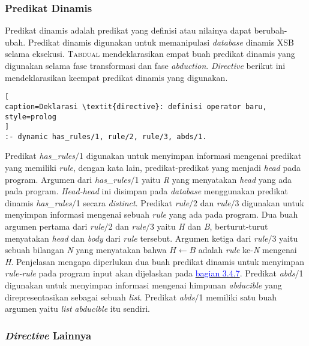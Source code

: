 \subsubsection{Predikat Dinamis}

Predikat dinamis adalah predikat yang definisi atau nilainya dapat berubah-ubah. Predikat dinamis digunakan untuk memanipulasi \textit{database} dinamis XSB selama eksekusi. \textsc{Tabdual} mendeklarasikan empat buah predikat dinamis yang digunakan selama fase transformasi dan fase \textit{abduction}. \textit{Directive} berikut ini mendeklarasikan keempat predikat dinamis yang digunakan. 
\\

\begin{lstlisting}[
caption=Deklarasi \textit{directive}: definisi operator baru,
style=prolog
]
:- dynamic has_rules/1, rule/2, rule/3, abds/1.
\end{lstlisting}

Predikat \textit{has\_rules$/$}1 digunakan untuk menyimpan informasi mengenai predikat yang memiliki \textit{rule}, dengan kata lain, predikat-predikat yang menjadi \textit{head} pada program. Argumen dari \textit{has\_rules$/$}1 yaitu \textit{R} yang menyatakan \textit{head} yang ada pada program. \textit{Head-head} ini disimpan pada \textit{database} menggunakan predikat dinamis \textit{has\_rules$/$}1 secara \textit{distinct}. Predikat \textit{rule$/$}2 dan \textit{rule$/$}3 digunakan untuk menyimpan informasi mengenai sebuah \textit{rule} yang ada pada program. Dua buah argumen pertama dari \textit{rule$/$}2 dan \textit{rule$/$}3 yaitu \textit{H} dan \textit{B}, berturut-turut menyatakan \textit{head} dan \textit{body} dari \textit{rule} tersebut. Argumen ketiga dari \textit{rule$/$}3 yaitu sebuah bilangan \textit{N} yang menyatakan bahwa \textit{$H \leftarrow B$} adalah \textit{rule} ke-\textit{N} mengenai \textit{H}.\label{rule2to3} Penjelasan mengapa diperlukan dua buah predikat dinamis untuk menyimpan \textit{rule-rule} pada program input akan dijelaskan pada \hyperref[subsec:add_indices]{\textcolor{blue}{bagian 3.4.7}}. Predikat \textit{abds$/$}1 digunakan untuk menyimpan informasi mengenai himpunan \textit{abducible} yang direpresentasikan sebagai sebuah \textit{list}. Predikat \textit{abds$/$}1 memiliki satu buah argumen yaitu \textit{list} \textit{abducible} itu sendiri.

\subsubsection{\textit{Directive} Lainnya}

